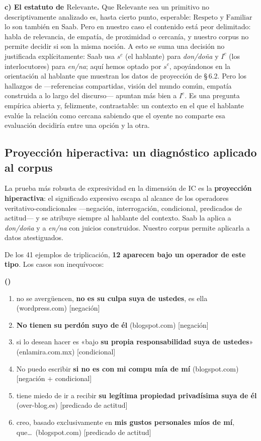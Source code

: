 \documentclass[12pt,a4paper]{article}
\newcounter{exnum}
\newenvironment{exe}{%
  \refstepcounter{exnum}%
  \par\medskip\noindent\textbf{(\theexnum)}\quad\ignorespaces
}{%
  \par\medskip
}
\newenvironment{exlist}{%
  \begin{enumerate}[label=\alph*., leftmargin=2.5em, itemsep=4pt, topsep=4pt]
}{%
  \end{enumerate}
}
\begin{document}
\textbf{c) El estatuto de $\text{Relevante}$.} Que $\text{Relevante}$ sea un primitivo no descriptivamente analizado es, hasta cierto punto, esperable: $\text{Respeto}$ y $\text{Familiar}$ lo son también en Saab. Pero en nuestro caso el contenido está peor delimitado: \textcite{companycompany1995} habla de relevancia, \textcite{risco2013} de empatía, \textcite{eguren2018} de proximidad o cercanía, y nuestro corpus no permite decidir si son la misma noción. A esto se suma una decisión no justificada explícitamente: Saab usa $s^c$ (el hablante) para \textit{don/doña} y $I^c$ (los interlocutores) para \textit{en/na}; aquí hemos optado por $s^c$, apoyándonos en la orientación al hablante que muestran los datos de proyección de \S\,6.2. Pero los hallazgos de \textcite{risco2013} ---referencias compartidas, visión del mundo común, empatía construida a lo largo del discurso--- apuntan más bien a $I^c$. Es una pregunta empírica abierta y, felizmente, contrastable: un contexto en el que el hablante evalúe la relación como cercana sabiendo que el oyente no comparte esa evaluación decidiría entre una opción y la otra.

\subsection{Proyección hiperactiva: un diagnóstico aplicado al corpus}

La prueba más robusta de expresividad en la dimensión de IC es la \textbf{proyección hiperactiva}: el significado expresivo escapa al alcance de los operadores veritativo-condicionales ---negación, interrogación, condicional, predicados de actitud--- y se atribuye siempre al hablante del contexto. Saab la aplica a \textit{don/doña} y a \textit{en/na} con juicios construidos. Nuestro corpus permite aplicarla a datos atestiguados.

De los 41 ejemplos de triplicación, \textbf{12 aparecen bajo un operador de este tipo}. Los casos son inequívocos:

\begin{exe}
\begin{exlist}
\item no se avergüencen, \textbf{no es su culpa suya de ustedes}, es ella (wordpress.com) [negación]
\item \textbf{No tienen su perdón suyo de él} (blogspot.com) [negación]
\item si lo desean hacer es «bajo \textbf{su propia responsabilidad suya de ustedes}» (enlamira.com.mx) [condicional]
\item No puedo escribir \textbf{si no es con mi compu mía de mí} (blogspot.com) [negación + condicional]
\item tiene miedo de ir a recibir \textbf{su legítima propiedad privadísima suya de él} (over-blog.es) [predicado de actitud]
\item creo, basado exclusivamente en \textbf{mis gustos personales míos de mí}, que\dots\ (blogspot.com) [predicado de actitud]
\end{exlist}
\end{exe}
\end{document}
